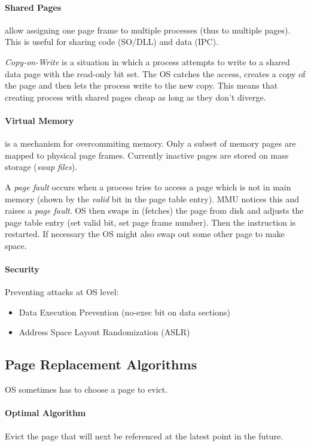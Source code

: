 \documentclass{article}
\begin{document}
\begin{multicols}{1}
\paragraph{Shared Pages} allow assigning one page frame to multiple processes (thus to multiple pages). This is useful for sharing code (SO/DLL) and data (IPC).

\emph{Copy-on-Write} is a situation in which a process attempts to write to a shared data page with the read-only bit set. The OS catches the access, creates a copy of the page and then lets the process write to the new copy. This means that creating process with shared pages cheap as long as they don't diverge.

\paragraph{Virtual Memory} is a mechanism for overcommiting memory. Only a subset of memory pages are mapped to physical page frames. Currently inactive pages are stored on mass storage (\emph{swap files}).

A \emph{page fault} occurs when a process tries to access a page which is not in main memory (shown by the \emph{valid} bit in the page table entry). MMU notices this and raises a \emph{page fault}. OS then swaps in (fetches) the page from disk and adjusts the page table entry (set valid bit, set page frame number). Then the instruction is restarted. If necessary the OS might also swap out some other page to make space.

\paragraph{Security} Preventing attacks at OS level:
\begin{itemize}
    \item Data Execution Prevention (no-exec bit on data sections)
    \item Address Space Layout Randomization (ASLR)
\end{itemize}

\subsection*{Page Replacement Algorithms}

OS sometimes has to choose a page to evict.

\paragraph{Optimal Algorithm} Evict the page that will next be referenced at the latest point in the future.


\end{multicols}
\end{document}

